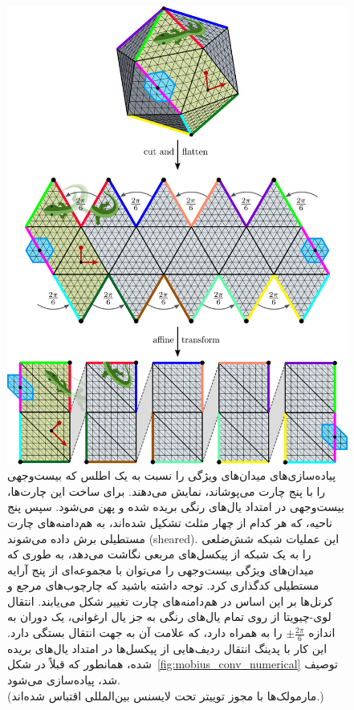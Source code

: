 \begin{figure}
	\centering
	\includegraphics[width=.9\textwidth]{figures/icosahedron_cutting.pdf}
	\vspace*{1.5ex}
	\caption{\small
		پیاده‌سازی‌های \cite{liu2018icoAltAz,gaugeIco2019,zhang2019orientation} میدان‌های ویژگی را نسبت به یک اطلس که بیست‌وجهی را با پنج چارت می‌پوشاند، نمایش می‌دهند.
		برای ساخت این چارت‌ها، بیست‌وجهی در امتداد یال‌های رنگی بریده شده و پهن می‌شود.
		سپس پنج ناحیه، که هر کدام از چهار مثلث تشکیل شده‌اند، به هم‌دامنه‌های چارت مستطیلی برش داده می‌شوند (sheared).
		این عملیات شبکه شش‌ضلعی را به یک شبکه از پیکسل‌های مربعی نگاشت می‌دهد، به طوری که میدان‌های ویژگی بیست‌وجهی را می‌توان با مجموعه‌ای از پنج آرایه مستطیلی کدگذاری کرد.
		توجه داشته باشید که چارچوب‌های مرجع و کرنل‌ها بر این اساس در هم‌دامنه‌های چارت تغییر شکل می‌یابند.
		انتقال لوی-چیویتا از روی تمام یال‌های رنگی به جز یال ارغوانی، یک دوران به اندازه $\pm\frac{2\pi}{6}$ را به همراه دارد، که علامت آن به جهت انتقال بستگی دارد.
		این کار با پدینگ انتقال ردیف‌هایی از پیکسل‌ها در امتداد یال‌های بریده شده، همانطور که قبلاً در شکل~\ref{fig:mobius_conv_numerical} توصیف شد، پیاده‌سازی می‌شود.
		{
			\\ \color{gray} \scriptsize
			(مارمولک‌ها با مجوز توییتر تحت لایسنس بین‌المللی 
			اقتباس شده‌اند.)
		}
	}
	\label{fig:ico_cutting}
\end{figure}



